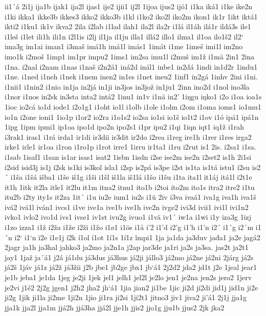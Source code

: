 ii1´á
2i1j
ija1b
ijak1
ija2l
ijas1
ije2
ijii1
ij2l
1ijoa
ijus2
ijö1
i1ka
iká1
i1ke
ike2n
i1ki
ikka1
ikke3b
ikkes3
ikko2
ikko3b
i1kl
i1ko2
iko2l
iko2m
ikon1
ik1r
1ikt
iktá1
ikti2
i1ku1
ik1v
ikva2
2ila
i2lab
i1lad
ilah1
ila2l
ila2r
i1lá
il1áh
ilá1r
ildá3s
ile1
i1leš
i1let
ili1h
ili1n
i2l1is
i2lj
il1ja
il1ju
illa1
illá2
illo1
ilma1
il1oa
ilo1š2
il2`
ima3g
im1ai
iman1
i3maš
imá1h
imá1l
imás1
1imát
i1me
1imeš
imi1l
im2no
imo1k
i2moš
1imp1
im1pr
impu2
1ims1
im2sa
imu1l
i2muš
im1ž
i1mä
2in1
2ina
i1na.
i2nal
i2nam
i1nas
i1naš
i2n2á1
iná2d
inál1
inbe1
in2dá
1indi
in1d2r
1indu1
i1ne.
i1ned
i1neh
i1nek
i1nem
inen2
in1es
i1net
ineu2
1inf1
in2gá
1inhv
2ini
i1ni.
i1nii1
i1nin2
i1nio
in1ja
in2já
in1ji
in3jos
in3jož
in1ju1
2inn
ino2d
i1nol
ino3la
i1nor
i1nos
in2sk
in3sta
inta2
intá2
1inu1
in1v
i1nä
in2'
1iŋgu
iŋko1
i2o
i1oa
ioa1s
1ioc
io2cá
io1d
iode1
i2o1g1
i1oht
io1l
i1olb
i1ole
i1olm
i2om
i1oma
ioms1
io1mu1
io1n
i2one
ioni1
1io1p
i1or2
io2ra
i1o1s2
io2sa
io1si
io1š
io1t2
i1ov
i1ó
ipá1
ipá1n
1ipg
1ipm
ipmi1
ip1oa
ipo1d
ipo2n
ipo2s1
i1pr
ipu2
i1qi
1iqn
iqt1
iq1ž
i1rah
i3rak1
iras1
i1rá
irda1
ir1di
ir3dii
ir3dit
ir2do
i2rea
i1reg
ire1h
i1rer
i1res
irga2
irke1
irle1
ir1oa
i1ron
i1ro1p
i1rot
irre1
1irru
ir1ta1
i1ru
i2rut
is1
2is.
i2sa1
i1sa.
i1sab
1isaf1
i1san
is1ar
isas1
isat2
1isbn
1isdn
i2se
ise2m
ise2n
i2set2
is1h
2i1si
i2sid
isid3j
is1j
i2sk
is1ki
is3kol
isla1
i2sp
is2pá
is3pe
i2st
is1ta
is1tá
istu1
i2su
is2´
i1ša
i1šá
išba1
i1še
iš1g
i1ši
i1šl
iš1la
iš1lá
i1šo
i1šu
i1ta
ita1l
it1áj
itá1l
i2t1e
it1h
1itk
it2la
itle1
it2lu
it1m
itna2
itnu1
ito1b
i2toi
ito2m
ito1s
itra2
itre2
i1tu
itu2b
i2ty
ity1s
it2za
1it´
i1u
iu2e
ium1
iu2s
i1ü
2iv
i3va
ivaá1
iva1g
iva1h
iva1š
ivá2
ivá1l
iván1
ivcs1
i1ve
ive1a
ive1b
ive1h
ive2n
ivge2
ivi3d
ivii1
ivi1l
ivi1n2
ivko1
ivlo2
ivo1d
ivs1
ivse1
iv1st
ivu2g
ivuo1
i1vä
iv1´
iw1a
i1wi
i1y
iza3g
1izj
i1zo
izza1
i1ž
i2ža
i1že
i2ži
i1žo
i1ø1
i1ös
i1å
i'2
i1'd
i2'g
i1'h
i1'n
i2´
i1´g
i2´m
i1´n
i2`
i1`n
ï2e
ï1e1j
í2k
í1ol
í1ot
1í1s
1í1z
împi1
1ja
ja1da
ja3duv
jađa1
ja2e
jagá2
2jagr
ja1h
ja3hal
jahko3
ja2mo
ja2n1a
j2ap
jar3de
ja1ri
ja2s
ja3sa.
jas2t
ja2t1
jay1
1jaž
ja´á1
j2á
já1du
já3dus
já3hus
já2ji
jállo3
já2mo
já2ne
já2ni
2járg
já2s
já2š
1jáv
já1z
já2ž
já3žii
j2b
jbe1
jb2ge
jbx1
jb`á1
2j2d2
jda2
jd1t
j2e
1jeal
jear1
je1b
jeba1
je1da
1jeg
je2ji
1jek
jel1
jelh1
jel2l
je2lo
jen1
je2na
jen2s
jero2
1jerv
je2vi
j1é2
2j2g
jgen1
j2h2
jha2
jh`á1
1jia
jian2
ji1be
1jic
ji2d
ji2di
jid1j
jid1n
ji2e
ji2g
1jik
ji1la
ji2me
1ji2n
1jio
ji1ra
ji2si
1ji2t1
jitno3
jiv1
jiva2
ji'á1
2j1j
jja1g
jja1k
jja2l
jja1m
jjá2h
jjá3ha
jjá2l
jje1h
jjis2
jjo1g
jju1b
jjus2
2jk
jka2
